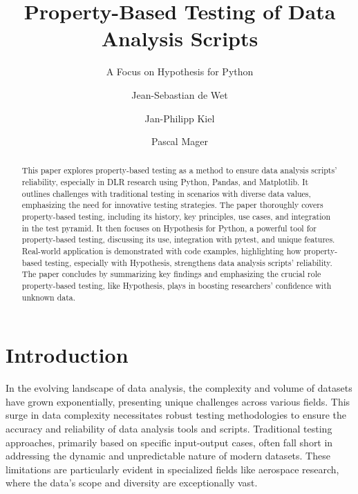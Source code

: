 \documentclass[runningheads]{llncs}
\begin{document}
%
\title{Property-Based Testing of Data Analysis Scripts}
\subtitle{A Focus on Hypothesis for Python}
%
%
\author{Jean-Sebastian de Wet \and
Jan-Philipp Kiel \and
Pascal Mager}
%
%
%
\maketitle              %
%
\begin{abstract}
This paper explores property-based testing as a method to ensure data analysis scripts' reliability, especially in DLR research using Python, Pandas, and Matplotlib. It outlines challenges with traditional testing in scenarios with diverse data values, emphasizing the need for innovative testing strategies. The paper thoroughly covers property-based testing, including its history, key principles, use cases, and integration in the test pyramid. It then focuses on Hypothesis for Python, a powerful tool for property-based testing, discussing its use, integration with pytest, and unique features. Real-world application is demonstrated with code examples, highlighting how property-based testing, especially with Hypothesis, strengthens data analysis scripts' reliability. The paper concludes by summarizing key findings and emphasizing the crucial role property-based testing, like Hypothesis, plays in boosting researchers' confidence with unknown data.

\end{abstract}
%
%
%
\section{Introduction}
In the evolving landscape of data analysis, the complexity and volume of datasets have grown exponentially, presenting unique challenges across various fields. This surge in data complexity necessitates robust testing methodologies to ensure the accuracy and reliability of data analysis tools and scripts. Traditional testing approaches, primarily based on specific input-output cases, often fall short in addressing the dynamic and unpredictable nature of modern datasets. These limitations are particularly evident in specialized fields like aerospace research, where the data's scope and diversity are exceptionally vast.
\end{document}
